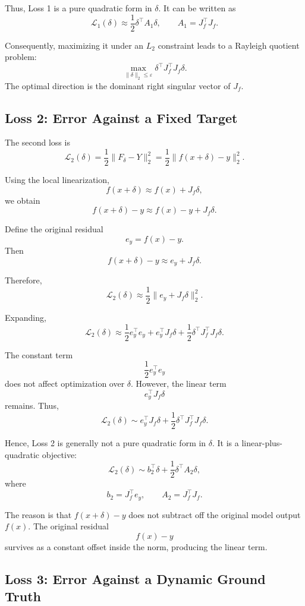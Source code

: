 \documentclass{article}
\begin{document}
Thus, Loss 1 is a pure quadratic form in \(\delta\). It can be written as
\[
    \mathcal L_1(\delta)
    \approx
    \frac{1}{2}\delta^\top A_1\delta,
    \qquad
    A_1=J_f^\top J_f.
\]

Consequently, maximizing it under an \(L_2\) constraint leads to a Rayleigh quotient problem:
\[
    \max_{\|\delta\|_2\le \varepsilon}
    \delta^\top J_f^\top J_f\delta.
\]
The optimal direction is the dominant right singular vector of \(J_f\).

\subsection{Loss 2: Error Against a Fixed Target}

The second loss is
\[
    \mathcal L_2(\delta)
    =
    \frac{1}{2}\|F_\delta-Y\|_2^2
    =
    \frac{1}{2}\|f(x+\delta)-y\|_2^2.
\]

Using the local linearization,
\[
    f(x+\delta)
    \approx
    f(x)+J_f\delta,
\]
we obtain
\[
    f(x+\delta)-y
    \approx
    f(x)-y+J_f\delta.
\]

Define the original residual
\[
    e_y=f(x)-y.
\]
Then
\[
    f(x+\delta)-y
    \approx
    e_y+J_f\delta.
\]

Therefore,
\[
    \mathcal L_2(\delta)
    \approx
    \frac{1}{2}\|e_y+J_f\delta\|_2^2.
\]

Expanding,
\[
    \mathcal L_2(\delta)
    \approx
    \frac{1}{2}e_y^\top e_y
    +
    e_y^\top J_f\delta
    +
    \frac{1}{2}\delta^\top J_f^\top J_f\delta.
\]

The constant term
\[
    \frac{1}{2}e_y^\top e_y
\]
does not affect optimization over \(\delta\). However, the linear term
\[
    e_y^\top J_f\delta
\]
remains. Thus,
\[
    \mathcal L_2(\delta)
    \sim
    e_y^\top J_f\delta
    +
    \frac{1}{2}\delta^\top J_f^\top J_f\delta.
\]

Hence, Loss 2 is generally not a pure quadratic form in \(\delta\). It is a linear-plus-quadratic objective:
\[
    \mathcal L_2(\delta)
    \sim
    b_2^\top \delta
    +
    \frac{1}{2}\delta^\top A_2\delta,
\]
where
\[
    b_2=J_f^\top e_y,
    \qquad
    A_2=J_f^\top J_f.
\]

The reason is that \(f(x+\delta)-y\) does not subtract off the original model output \(f(x)\). The original residual
\[
    f(x)-y
\]
survives as a constant offset inside the norm, producing the linear term.

\subsection{Loss 3: Error Against a Dynamic Ground Truth}
\end{document}
